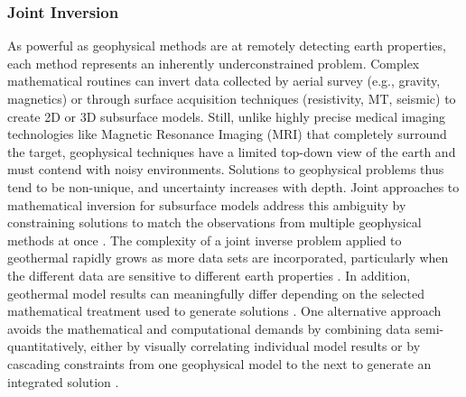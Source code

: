 \subsubsection{Joint Inversion}
As powerful as geophysical methods are at remotely detecting earth properties, each method represents an inherently underconstrained problem. Complex mathematical routines can invert data collected by aerial survey (e.g., gravity, magnetics) or through surface acquisition techniques (resistivity, MT, seismic) to create 2D or 3D subsurface models. Still, unlike highly precise medical imaging technologies like Magnetic Resonance Imaging (MRI) that completely surround the target, geophysical techniques have a limited top-down view of the earth and must contend with noisy environments. Solutions to geophysical problems thus tend to be non-unique, and uncertainty increases with depth. Joint approaches to mathematical inversion for subsurface models address this ambiguity by constraining solutions to match the observations from multiple geophysical methods at once \citep{vozoff_joint_1975}. The complexity of a joint inverse problem applied to geothermal rapidly grows as more data sets are incorporated, particularly when the different data are sensitive to different earth properties \citep{moorkamp_framework_2011}. In addition, geothermal model results can meaningfully differ depending on the selected mathematical treatment used to generate solutions \citep{rosenkjaer_comparison_2015}. One alternative approach avoids the mathematical and computational demands by combining data semi-quantitatively, either by visually correlating individual model results or by cascading constraints from one geophysical model to the next to generate an integrated solution \citep{jousset_hengill_2011, lichoro_joint_2019}.


